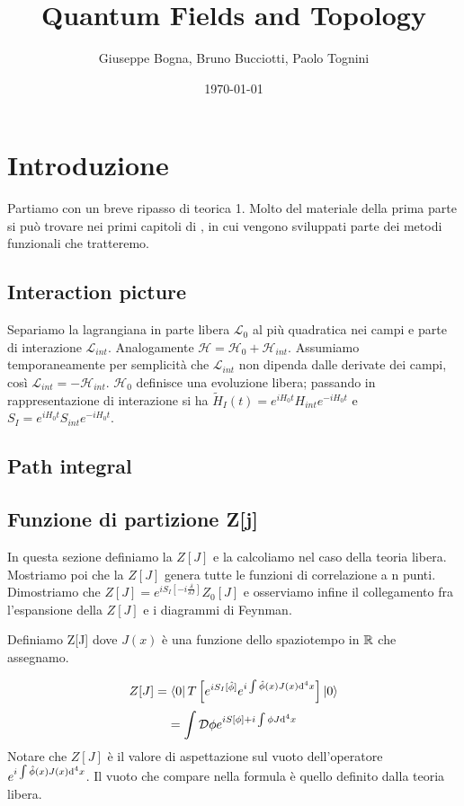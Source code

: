 \documentclass[a4paper, 11pt]{article}
\date{\today}
\author{Giuseppe Bogna, Bruno Bucciotti, Paolo Tognini}
\title{Quantum Fields and Topology}
\begin{document}
	\maketitle
	\tableofcontents
	\clearpage
	
	\section{Introduzione}
	
	Partiamo con un breve ripasso di teorica 1. Molto del materiale della prima parte si può trovare nei primi capitoli di \cite{anselmi}, in cui vengono sviluppati parte dei metodi funzionali che tratteremo.
	
	\subsection{Interaction picture}
	Separiamo la lagrangiana in parte libera $\mathcal{L}_0$ al più quadratica nei campi e parte di interazione $\mathcal{L}_{int}$. Analogamente $\mathcal{H} = \mathcal{H}_0+\mathcal{H}_{int}$. Assumiamo temporaneamente per semplicità che $\mathcal{L}_{int}$ non dipenda dalle derivate dei campi, così $\mathcal{L}_{int} = -\mathcal{H}_{int}$. $\mathcal{H}_0$ definisce una evoluzione libera; passando in rappresentazione di interazione si ha $\tilde{H}_I(t) = e^{iH_0t}H_{int}e^{-iH_0t}$ e $S_I = e^{iH_0t}S_{int}e^{-iH_0t}$.
	
	\subsection{Path integral}
	
	
	\subsection{Funzione di partizione Z[j]}
	In questa sezione definiamo la $Z[J]$ e la calcoliamo nel caso della teoria libera. Mostriamo poi che la $Z[J]$ genera tutte le funzioni di correlazione a n punti. Dimostriamo che $Z[J] = e^{iS_I[-i\frac{\delta}{\delta J}]} Z_0[J]$ e osserviamo infine il collegamento fra l'espansione della $Z[J]$ e i diagrammi di Feynman.
	
	
	Definiamo Z[J] dove $J(x)$ è una funzione dello spaziotempo in $\mathbb{R}$ che assegnamo.
	
	\[ Z[J] = \left\langle 0\right|T\left[e^{iS_I[\hat{\phi}]}e^{i\int{\hat{\phi}(x)J(x)}\mathrm{d}^4x}\right]\left| 0\right\rangle \]
	\[ = \int \mathcal{D}\phi e^{iS[\phi] + i \int \phi J \mathrm{d}^4 x} \]
	Notare che $Z[J]$ è il valore di aspettazione sul vuoto dell'operatore $e^{i\int{\hat{\phi}(x)J(x)}\mathrm{d}^4x}$. Il vuoto che compare nella formula è quello definito dalla teoria libera.
	\\
		
\end{document}
